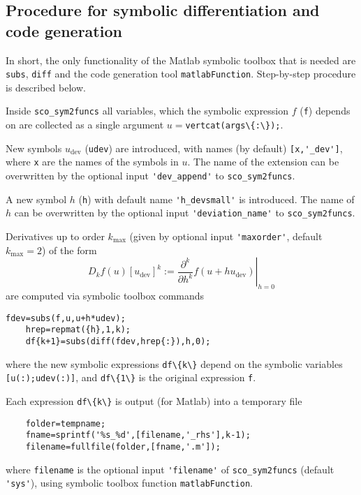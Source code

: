 \documentclass[11pt]{scrartcl}
\newcommand{\blist}[1]{\mbox{\lstinline!#1!}}
\newcommand{\mlvar}[1]{\lstinline[keywordstyle=\color{var}]!#1!}
\begin{document}
\subsection{Procedure for symbolic differentiation and code generation}
\label{sec:diff}
In short, the only functionality of the Matlab symbolic toolbox that
is needed are \blist{subs}, \mlvar{diff} and the code generation tool
\blist{matlabFunction}. Step-by-step procedure is described below.
\begin{compactenum}
\item Inside \blist{sco_sym2funcs} all variables, which the symbolic
expression $f$ (\blist{f}) depends on are collected as a single argument
$u=$\blist{vertcat(args\{:\});}. 
\item New symbols $u_\mathrm{dev}$ (\blist{udev}) are introduced, with names (by
  default) \blist{[x,'_dev']}, where \blist{x} are the names of the
  symbols in $u$. The name of the extension can be overwritten by the
  optional input \blist{'dev_append'} to \blist{sco_sym2funcs}.
\item A new symbol $h$ (\blist{h}) with default name
  \blist{'h_devsmall'} is introduced. The name of $h$ can be
  overwritten by the optional input \blist{'deviation_name'} to
  \blist{sco_sym2funcs}.
\item Derivatives up to order $k_{\max}$ (given by optional input
  \blist{'maxorder'}, default $k_{\max}=2$) of the form
  \begin{equation}\label{dir1deriv}
    D_kf(u)[u_\mathrm{dev}]^k:=\left.\frac{\partial^k}{\partial h^k}f(u+hu_\mathrm{dev})\right\vert_{h=0}
  \end{equation}
  are computed via symbolic toolbox commands
  \begin{lstlisting}[frame=lines]
    fdev=subs(f,u,u+h*udev);
    hrep=repmat({h},1,k);
    df{k+1}=subs(diff(fdev,hrep{:}),h,0);
  \end{lstlisting}
  where the new symbolic expressions \blist{df\{k\}} depend on the
  symbolic variables \blist{[u(:);udev(:)]}, and \blist{df\{1\}} is the original expression \blist{f}.
\item Each expression \blist{df\{k\}} is output (for Matlab) into a temporary file
  \begin{lstlisting}
    folder=tempname;
    fname=sprintf('%s_%d',[filename,'_rhs'],k-1);
    filename=fullfile(folder,[fname,'.m']);
  \end{lstlisting}
  where \blist{filename} is the optional input \blist{'filename'} of
  \blist{sco_sym2funcs} (default \blist{'sys'}), using symbolic
  toolbox function \blist{matlabFunction}.


\end{compactenum}
\end{document}
